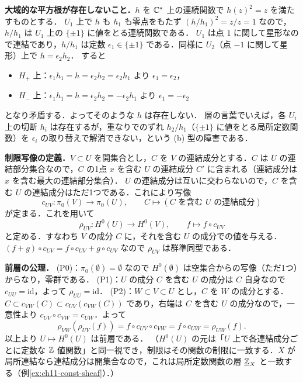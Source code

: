 \textbf{大域的な平方根が存在しないこと．}$h$ を $\mathbb{C}^*$ 上の連続関数で $h(z)^2=z$ を満たすものとする．
$U_1$ 上で $h$ も $h_1$ も零点をもたず $(h/h_1)^2=z/z=1$ なので，$h/h_1$ は $U_1$ 上の $\{\pm1\}$ に値をとる連続関数である．
$U_1$ は点 $1$ に関して星形なので連結であり，$h/h_1$ は定数 $\epsilon_1\in\{\pm1\}$ である．同様に $U_2$（点 $-1$ に関して星形）上で $h=\epsilon_2h_2$．
すると
\begin{itemize}
  \item $H_+$ 上：$\epsilon_1h_1=h=\epsilon_2h_2=\epsilon_2h_1$ より $\epsilon_1=\epsilon_2$，
  \item $H_-$ 上：$\epsilon_1h_1=h=\epsilon_2h_2=-\epsilon_2h_1$ より $\epsilon_1=-\epsilon_2$
\end{itemize}
となり矛盾する．よってそのような $h$ は存在しない．
層の言葉でいえば，各 $U_i$ 上の切断 $h_i$ は存在するが，重なりでのずれ $h_2/h_1$（$\{\pm1\}$ に値をとる局所定数関数）を $\epsilon_i$ の取り替えで解消できない，という (b) 型の障害である．

\textbf{制限写像の定義．}$V\subset U$ を開集合とし，$C$ を $V$ の連結成分とする．$C$ は $U$ の連結部分集合なので，$C$ の1点 $x$ を含む $U$ の連結成分 $C'$ に含まれる（連結成分は $x$ を含む最大の連結部分集合）．
$U$ の連結成分は互いに交わらないので，$C$ を含む $U$ の連結成分はただ1つである．これにより写像
\[
  c_{UV}:\pi_0(V)\to\pi_0(U),\qquad C\mapsto(C\text{ を含む }U\text{ の連結成分})
\]
が定まる．これを用いて
\[
  \rho_{UV}:H^0(U)\to H^0(V),\qquad f\mapsto f\circ c_{UV}
\]
と定める．すなわち $V$ の成分 $C$ に，それを含む $U$ の成分での値を与える．$(f+g)\circ c_{UV}=f\circ c_{UV}+g\circ c_{UV}$ なので $\rho_{UV}$ は群準同型である．

\textbf{前層の公理．}
(P0)：$\pi_0(\emptyset)=\emptyset$ なので $H^0(\emptyset)$ は空集合からの写像（ただ1つ）からなり，零群である．
(P1)：$U$ の成分 $C$ を含む $U$ の成分は $C$ 自身なので $c_{UU}=\mathrm{id}$，よって $\rho_{UU}=\mathrm{id}$．
(P2)：$W\subset V\subset U$ とし，$C$ を $W$ の成分とする．$C\subset c_{VW}(C)\subset c_{UV}(c_{VW}(C))$ であり，右端は $C$ を含む $U$ の成分なので，一意性より $c_{UV}\circ c_{VW}=c_{UW}$．よって
\[
  \rho_{VW}(\rho_{UV}(f))=f\circ c_{UV}\circ c_{VW}=f\circ c_{UW}=\rho_{UW}(f).
\]
以上より $U\mapsto H^0(U)$ は前層である．
（$H^0(U)$ の元は「$U$ 上で各連結成分ごとに定数な $\mathbb{Z}$ 値関数」と同一視でき，制限はその関数の制限に一致する．$X$ が局所連結なら連結成分は開集合なので，これは局所定数関数の層 $\underline{\mathbb{Z}}_X$ と一致する（例\ref{ex:ch11-const-sheaf}）．）

